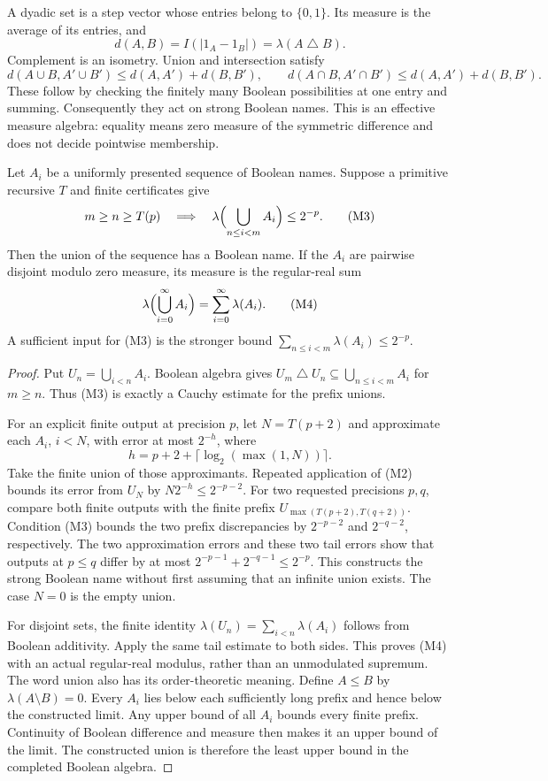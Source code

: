 A dyadic set is a step vector whose entries belong to \(\{0,1\}\).
Its measure is the average of its entries, and
\[
 d(A,B)=I(|1_A-1_B|)=\lambda(A\mathbin{\triangle}B).
\]
Complement is an isometry.  Union and intersection satisfy
\[
 d(A\cup B,A'\cup B')\le d(A,A')+d(B,B'),
 \qquad
 d(A\cap B,A'\cap B')\le d(A,A')+d(B,B').
 \tag{M2}
\]
These follow by checking the finitely many Boolean possibilities at one
entry and summing.  Consequently they act on strong Boolean names.
This is an effective measure algebra: equality means zero measure of the
symmetric difference and does not decide pointwise membership.

\begin{theorem}\label{m:union}
Let \(A_i\) be a uniformly presented sequence of Boolean names.  Suppose a
primitive recursive \(T\) and finite certificates give
\[
 m\ge n\ge T(p)
 \quad\Longrightarrow\quad
 \lambda\Bigl(\bigcup_{n\le i<m} A_i\Bigr)\le2^{-p}.
 \tag{M3}
\]
Then the union of the sequence has a Boolean name.  If the \(A_i\) are
pairwise disjoint modulo zero measure, its measure is the regular-real sum
\[
 \lambda\Bigl(\bigcup_{i=0}^{\infty}A_i\Bigr)
       =\sum_{i=0}^{\infty}\lambda(A_i).
 \tag{M4}
\]
A sufficient input for (M3) is the stronger bound
\(\sum_{n\le i<m}\lambda(A_i)\le2^{-p}\).
\end{theorem}

\begin{proof}
Put \(U_n=\bigcup_{i<n}A_i\).  Boolean algebra gives
\(U_m\mathbin{\triangle}U_n\subseteq\bigcup_{n\le i<m}A_i\) for \(m\ge n\).
Thus (M3) is exactly a Cauchy estimate for the prefix unions.

For an explicit finite output at precision \(p\), let
\(N=T(p+2)\) and approximate each \(A_i\), \(i<N\), with error at most
\(2^{-h}\), where
\[
 h=p+2+\lceil\log_2(\max(1,N))\rceil.
\]
Take the finite union of those approximants.  Repeated application of (M2)
bounds its error from \(U_N\) by \(N2^{-h}\le2^{-p-2}\).
For two requested precisions \(p,q\), compare both finite outputs with the
finite prefix \(U_{\max(T(p+2),T(q+2))}\).  Condition (M3) bounds the two
prefix discrepancies by \(2^{-p-2}\) and \(2^{-q-2}\), respectively.
The two approximation errors and these two tail errors show that outputs
at \(p\le q\) differ by at most
\(2^{-p-1}+2^{-q-1}\le2^{-p}\).  This constructs the strong Boolean name
without first assuming that an infinite union exists.
The case \(N=0\) is the empty union.

For disjoint sets, the finite identity
\(\lambda(U_n)=\sum_{i<n}\lambda(A_i)\) follows from Boolean additivity.
Apply the same tail estimate to both sides.  This proves (M4) with an actual
regular-real modulus, rather than an unmodulated supremum.
The word union also has its order-theoretic meaning.  Define \(A\le B\) by
\(\lambda(A\setminus B)=0\).  Every \(A_i\) lies below each sufficiently long
prefix and hence below the constructed limit.  Any upper bound of all
\(A_i\) bounds every finite prefix.  Continuity of Boolean difference and
measure then makes it an upper bound of the limit.  The constructed union
is therefore the least upper bound in the completed Boolean algebra.
\end{proof}

